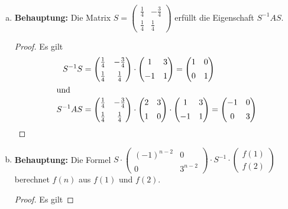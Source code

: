 \documentclass{article}
\begin{document}
\begin{enumerate}[(a)]
\begin{proof}
    	\end{proof}
\item \textbf{Behauptung:} Die Matrix $S =\begin{pmatrix}\frac{1}{4} & -\frac{3}{4}\\[0.5em] \frac{1}{4} & \frac{1}{4} \end{pmatrix} $ erfüllt die Eigenschaft $S^{-1}AS.$
\begin{proof} 
	Es gilt  	
	\begin{align*}
	S^{-1}S & =  \begin{pmatrix}\frac{1}{4} & -\frac{3}{4}\\[0.5em] \frac{1}{4} & \frac{1}{4} \end{pmatrix} \cdot  \begin{pmatrix} 1 & 3 \\[0.5em] -1 & 1 \end{pmatrix} = \begin{pmatrix} 1 & 0 \\[0.5em] 0 & 1 \end{pmatrix}\\
	\intertext{und} 
	S^{-1}AS &= \begin{pmatrix}\frac{1}{4} & -\frac{3}{4}\\[0.5em] \frac{1}{4} & \frac{1}{4} \end{pmatrix} \cdot \begin{pmatrix}
	2 & 3 \\[0.5em]
	1 & 0 
	\end{pmatrix} \cdot \begin{pmatrix} 1 & 3 \\[0.5em] -1 & 1 \end{pmatrix} = \begin{pmatrix} -1 & 0 \\[0.5em] 0 & 3 \end{pmatrix}\\
	\end{align*} 
	\end{proof}
\item \textbf{Behauptung:} Die Formel $S \cdot \left (\begin{matrix} (-1)^{n-2} & 0 \\ 0 & 3^{n-2} \end{matrix}\right ) \cdot S^{-1} \cdot \left (\begin{matrix} f(1) \\ f(2) \end{matrix}\right )$  berechnet $f(n)$ aus $f(1)$ und $f(2)$.
\begin{proof} Es gilt

\end{proof}
\end{enumerate}
\end{document}
